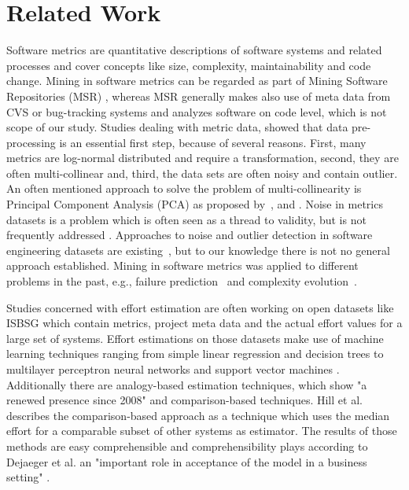 \section{Related Work}
\label{sec:related}
Software metrics are quantitative descriptions of software systems and related processes and cover concepts like size, complexity, maintainability and code change. Mining in software metrics can be regarded as part of Mining Software Repositories (MSR) \cite{kagdi2007survey}, whereas MSR generally makes also use of meta data from CVS or bug-tracking systems and analyzes software on code level, which is not scope of our study. Studies dealing with metric data, showed that data pre-processing is an essential first step, because of several reasons. First, many metrics are log-normal distributed and require a transformation, second, they are often multi-collinear and, third, the data sets are often noisy and contain outlier. An often mentioned approach to solve the problem of multi-collinearity is Principal Component Analysis (PCA) as proposed by~\cite{dick2004data}, \cite{nagappan2006mining} and \cite{nikora2003understanding}. Noise in metrics datasets is a problem which is often seen as a thread to validity, but is not frequently addressed \cite{liebchen2010data}. Approaches to noise and outlier detection in software engineering datasets are existing~\cite{lep2013noise}, but to our knowledge there is not no general approach established. Mining in software metrics was applied to different problems in the past, e.g., failure prediction~\cite{nagappan2006mining} \cite{finlay2011mining} and complexity evolution~\cite{nikora2003understanding}.

Studies concerned with effort estimation are often working on open datasets like ISBSG which contain metrics, project meta data and the actual effort values for a large set of systems. Effort estimations on those datasets make use of machine learning techniques ranging from simple linear regression and decision trees to multilayer perceptron neural networks and support vector machines \cite{dejaeger2012data}. Additionally there are analogy-based estimation techniques, which show "a renewed presence since 2008" \cite{fernandez2014potential} and comparison-based techniques. Hill et al. \cite{hill2010practical} describes the comparison-based approach as a technique which uses the median effort for a comparable subset of other systems as estimator. The results of those methods are easy comprehensible and comprehensibility plays according to Dejaeger et al. an "important role in acceptance of the model in a business setting" \cite{dejaeger2012data}.

